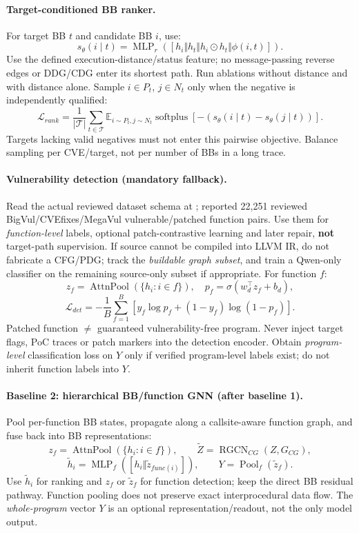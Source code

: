 \documentclass[10pt,a4paper]{article}
\begin{document}
\paragraph{Target-conditioned BB ranker.}
For target BB $t$ and candidate BB $i$, use:
\[
 s_\theta(i\mid t)=\operatorname{MLP}_r
 ([h_i\Vert h_t\Vert h_i\odot h_t\Vert\phi(i,t)]).
\]
Use the defined execution-distance/status feature; no message-passing reverse edges or DDG/CDG enter its shortest path. Run ablations without distance and with distance alone. Sample $i\in P_t$, $j\in N_t$ only when the negative is independently qualified:
\[
 \mathcal L_{rank}=\frac1{|\mathcal T|}\sum_{t\in\mathcal T}
 \mathbb E_{i\sim P_t,j\sim N_t}
 \operatorname{softplus}[-(s_\theta(i\mid t)-s_\theta(j\mid t))].
\]
Targets lacking valid negatives must not enter this pairwise objective. Balance sampling per CVE/target, not per number of BBs in a long trace.

\paragraph{Vulnerability detection (mandatory fallback).}
Read the actual reviewed dataset schema at ; reported 22,251 reviewed BigVul/CVEfixes/MegaVul vulnerable/patched function pairs. Use them for \emph{function-level} labels, optional patch-contrastive learning and later repair, \textbf{not} target-path supervision. If source cannot be compiled into LLVM IR, do not fabricate a CFG/PDG; track the \emph{buildable graph subset}, and train a Qwen-only classifier on the remaining source-only subset if appropriate. For function $f$:
\[
 z_f=\operatorname{AttnPool}(\{h_i:i\in f\}),\quad
 p_f=\sigma(w_d^\top z_f+b_d),
\]
\[
 \mathcal L_{det}= -\frac1B\sum_{f=1}^B
 [y_f\log p_f+(1-y_f)\log(1-p_f)].
\]
Patched function $\ne$ guaranteed vulnerability-free program. Never inject target flags, PoC traces or patch markers into the detection encoder. Obtain \emph{program-level} classification loss on $Y$ only if verified program-level labels exist; do not inherit function labels into $Y$.

\paragraph{Baseline 2: hierarchical BB/function GNN (after baseline 1).}
Pool per-function BB states, propagate along a callsite-aware function graph, and fuse back into BB representations:
\[
 z_f=\operatorname{AttnPool}(\{h_i:i\in f\}),\qquad
 \tilde Z=\operatorname{RGCN}_{CG}(Z,G_{CG}),
\]
\[
 \tilde h_i=\operatorname{MLP}_f([h_i\Vert\tilde z_{func(i)}]),
 \qquad Y=\operatorname{Pool}_{f}(\tilde z_f).
\]
Use $\tilde h_i$ for ranking and $z_f$ or $\tilde z_f$ for function detection; keep the direct BB residual pathway. Function pooling does not preserve exact interprocedural data flow. The \emph{whole-program} vector $Y$ is an optional representation/readout, not the only model output.
\end{document}

